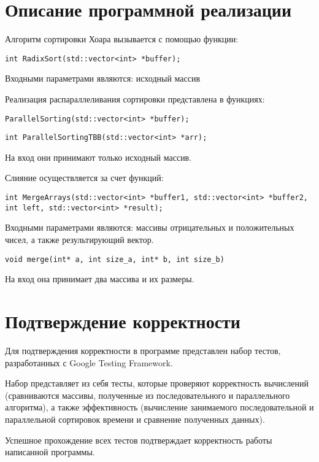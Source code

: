 \documentclass{report}
\begin{document}
\section*{Описание программной реализации}
Алгоритм сортировки Хоара вызывается с помощью функции:
\begin{lstlisting}
int RadixSort(std::vector<int> *buffer);
\end{lstlisting}
\par Входными параметрами являются: исходный массив
\par Реализация распараллеливания сортировки представлена в функциях:
\begin{lstlisting}
ParallelSorting(std::vector<int> *buffer);
\end{lstlisting}
\begin{lstlisting}
int ParallelSortingTBB(std::vector<int> *arr);
\end{lstlisting}
\par На вход они принимают только исходный массив.
\par Слияние осуществляется за счет функций:
\begin{lstlisting}
int MergeArrays(std::vector<int> *buffer1, std::vector<int> *buffer2, int left, std::vector<int> *result);
\end{lstlisting}
\par Входными параметрами являются: массивы отрицательных и положительных чисел, а также результирующий вектор.
\begin{lstlisting}
void merge(int* a, int size_a, int* b, int size_b)
\end{lstlisting}
\par На вход она принимает два массива и их размеры.
\newpage

\section*{Подтверждение корректности}
Для подтверждения корректности в программе представлен набор тестов, разработанных с Google Testing Framework.
\par Набор представляет из себя тесты, которые проверяют корректность вычислений (сравниваются массивы, полученные из последовательного и параллельного алгоритма), а также эффективность (вычисление занимаемого последовательной и параллельной сортировок времени и сравнение полученных данных).
\par Успешное прохождение всех тестов подтверждает корректность работы написанной программы.
\newpage
\end{document}
